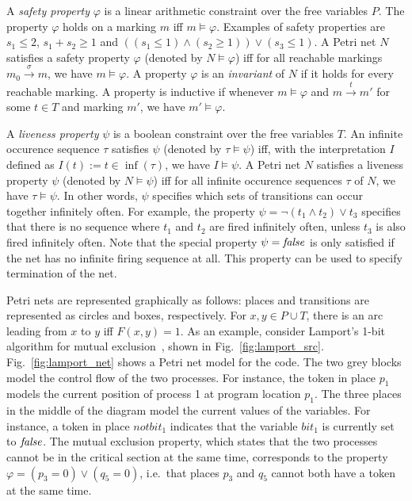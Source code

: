 A \emph{safety property} $\varphi$ is a linear arithmetic constraint over the free variables $P$. 
The property $\varphi$ holds on a marking $m$ iff $m \models \varphi$.
 Examples of safety properties are $s_1 \le 2$, $s_1 + s_2 \ge 1$ and
 $((s_1 \le 1) \land (s_2 \ge 1)) \lor (s_3 \le 1)$.
A Petri net $N$ satisfies a safety property $\varphi$ (denoted by $N \models \varphi$)
iff for all reachable markings $m_0 \xrightarrow{\sigma} m$, we have
$m \models \varphi$.
A property $\varphi$ is an \emph{invariant} of $N$ if it holds for every reachable marking.
A property is inductive if whenever $m\models \varphi$ and $m \xrightarrow{t} m'$ for some $t\in T$
and marking $m'$, we have $m'\models \varphi$.

A \emph{liveness property} $\psi$ is a boolean constraint over the free variables $T$.
An infinite occurence sequence $\tau$ satisfies $\psi$ (denoted by $\tau \models \psi$)
iff, with the interpretation $I$ defined as $I(t) := t \in \inf(\tau)$, we have $I \models \psi$.
A Petri net $N$ satisfies a liveness property $\psi$ (denoted by $N \models \psi$)
iff for all infinite occurence sequences $\tau$ of $N$, we have $\tau \models \psi$.
In other words, $\psi$ specifies which sets of transitions can occur
together infinitely often. For example, the property $\psi = \neg (t_1 \land t_2) \lor t_3$
specifies that there is no sequence where $t_1$ and $t_2$ are fired infinitely often, unless
$t_3$ is also fired infinitely often. Note that the special property $\psi = \operatorname{\mathit{false}}$ is only
satisfied if the net has no infinite firing sequence at all.
This property can be used to specify termination of the net.



Petri nets are represented graphically as follows: places and transitions
are represented as circles and boxes, respectively. For $x, y \in P \cup T$,
there is an arc leading from $x$ to $y$ if{}f $F(x,y)=1$.
%
As an example, consider Lamport's 1-bit
algorithm for mutual exclusion~\autocite{Lamport86}, shown in
Fig.~\ref{fig:lamport_src}.
Fig.~\ref{fig:lamport_net} shows a Petri net model for the code.
The two grey blocks model the control flow of the two
processes. For instance, the token in place $p_1$ models the current
position of process 1 at program location $p_1$. The three places in the middle of the
diagram model the current values of the variables. For instance, a
token in place $notbit_1$ indicates that the variable $bit_1$ is currently
set to $\operatorname{\mathit{false}}$.
The mutual exclusion property, which states that the two processes cannot be in the
critical section at the same time, corresponds to the property
$\varphi = (p_3 = 0) \lor (q_5 = 0)$, i.e.\ that
places $p_3$ and $q_5$ cannot both have a token at the same time.


\newpage





